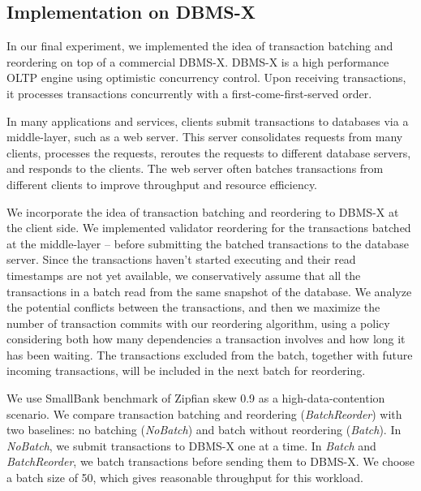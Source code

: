 \subsection{Implementation on DBMS-X}
\label{subsec:experiment:compare}

In our final experiment, we implemented the idea of transaction batching and reordering on top of a commercial DBMS-X. DBMS-X is a high performance OLTP engine using optimistic concurrency control. Upon receiving transactions, it processes transactions concurrently with a first-come-first-served order.

In many applications and services, clients submit transactions to databases via a middle-layer, such as a web server. This server consolidates requests from many clients, processes the requests, reroutes the requests to different database servers, and responds to the clients. The web server often batches transactions from different clients to improve throughput and resource efficiency. 

We incorporate the idea of transaction batching and reordering to DBMS-X at the client side.
We implemented validator reordering for the transactions batched at the middle-layer -- before submitting the batched transactions to the database server. Since the transactions haven't started executing and their read timestamps are not yet available, we conservatively assume that all the transactions in a batch read from the same snapshot of the database. We analyze the potential conflicts between the transactions, and then we maximize the number of transaction commits with our reordering algorithm, using a policy considering both how many dependencies a transaction involves and how long it has been waiting. The transactions excluded from the batch, together with future incoming transactions, will be included in the next batch for reordering.

We use SmallBank benchmark of Zipfian skew 0.9 as a high-data-contention scenario. We compare transaction batching and reordering (\emph{BatchReorder}) with two baselines: no batching (\emph{NoBatch}) and batch without reordering (\emph{Batch}). In \emph{NoBatch}, we submit transactions to DBMS-X one at a time. In \emph{Batch} and \emph{BatchReorder}, we batch transactions before sending them to DBMS-X. We choose a batch size of 50, which gives reasonable throughput for this workload.

